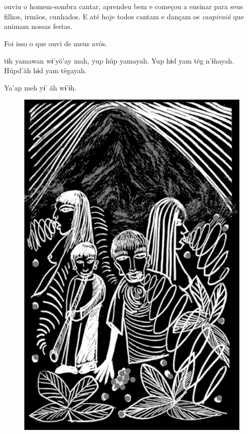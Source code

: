 \chapter*{}

\mbox{}\vspace*{\fill}

 ouviu o homem-sombra cantar,
aprendeu bem e
começou a ensinar
para seus filhos,
irmãos, cunhados.
E até hoje todos
cantam e dançam os
\textit{caapivaiá} que animam
nossas festas.

\medskip

Foi isso o que ouvi de
meus avós.

\vspace{2em}

 tɨh yamawan
wɨ’yö’ay mah, yup húp
yamayah. Yup hɨd yam
tëg n’ɨhayah. Húpd’äh
hɨd yam tëgayah.

\medskip

Ya’ap meh yɨ’ ãh wɨ’ɨh.

\vspace*{\fill}

\begin{figure}
\vspace*{-1.5cm}
\hspace*{-2.4cm}\includegraphics[width=142mm]{./imgs/img9.jpg}
\end{figure}

